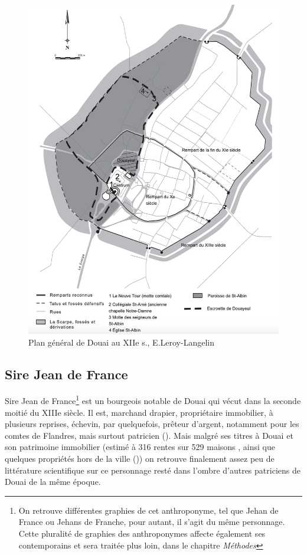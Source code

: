 \begin{figure}[ht] %
    \centering
    \includegraphics[scale=1]{1.Introduction/Img/Plan général de la ville de Douai avec les enceintes successives. DAO : E. Leroy-Langelin.png} 
    \caption{Plan général de Douai au XIIe s., E.Leroy-Langelin}
\end{figure}

\subsection{Sire Jean de France}
Sire Jean de France\footnote{On retrouve différentes graphies de cet anthroponyme, tel que \og Jehan de France\fg{} ou \og Jehans de Franche\fg{}, pour autant, il s'agit du même personnage. Cette pluralité de graphies des anthroponymes affecte également ses contemporains et sera traitée plus loin, dans le chapitre \textit{Méthodes}} est un bourgeois notable de Douai qui vécut dans la seconde moitié du XIIIe siècle. Il est, marchand drapier, propriétaire immobilier, à plusieurs reprises, échevin, par quelquefois, prêteur d'argent, notamment pour les comtes de Flandres, mais surtout patricien (\cite{espinas_les_1933}). 
Mais malgré ses titres à Douai et son patrimoine immobilier (estimé à 316 rentes sur 529 maisons , ainsi que quelques propriétés hors de la ville (\cite{blockmans_trois_1941})) on retrouve finalement assez peu de littérature scientifique sur ce personnage resté dans l'ombre d'autres patriciens de Douai de la même époque.

